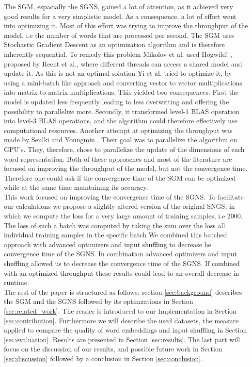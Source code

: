 The SGM, espacially the SGNS, gained a lot of attention, as it achieved very good results for a very simplistic model. As a consequence, a lot of effort went into optimizing it. Most of this effort was trying to improve the throughput of the model, i.e the number of words that are processed per second. The SGM uses Stochastic Gradient Descent as an optimization algorithm and is therefore inherently sequential. To remedy this problem Mikolov et al. used Hogwild! \cite{hogwild}, proposed by Recht et al., where different threads can access a shared model and update it. As this is not an optimal solution Yi et al. \cite{intel} tried to optimize it, by using a mini-batch like approach and converting vector to vector multiplications into matrix to matrix multiplications. This yielded two consequences: First the model is updated less frequently leading to less overwriting and offering the possibility to parallelize more. Secondly, it transformed level-1 BLAS operation into level-3 BLAS operations, and the algorithm could therefore effectively use computational resources. Another attempt at optimizing the throughput was made by Seulki and Youngmin \cite{gpu}. Their goal was to parallelize the algorithm on GPU's. They, therefore, chose to parallelize the update of the dimensions of each word representation. Both of these approaches and most of the literature are focused on improving the throughput of the model, but not the convergence time.  Therefore one could ask if the convergence time of the SGM can be optimized while at the same time maintaining its accuracy.\\
This work focused on improving the convergence time of the SGNS. To facilitate our calculations we propose a slightly altered version of the original SNGS, in which we compute the loss for a very large amount of training samples, i.e 2000. The loss of such a batch was computed by taking the sum over the loss all individual training samples in the specific batch We combined this batched approach with advanced optimizers and input shuffling to decrease he convergence time of the SGNS. In combination advanced optimizers and input shuffling allowed us to decrease the convergence time of the SGNS. If combined with an optimized throughput these results could lead to an overall decrease in runtime.\\
 The rest of the paper is structured as follows: section \ref{sec:background}  describes the SGM and the SGNS followed by its optimzations in Section \ref{sec:related_work}.  The reader is introduced to our Implementation in Section \ref{sec:contribution}. Furthermore  we will describe the used datasets, the measure applied to compare the quality of word embeddings and input shuffling in Section \ref{sec:evaluation}. Results are presented in  Section \ref{sec:results}. The last part will focus on the discussion of our results, and possible future work in Section \ref{sec:discussion} followed by a conclusion in Section \ref{sec:conclusion}.
